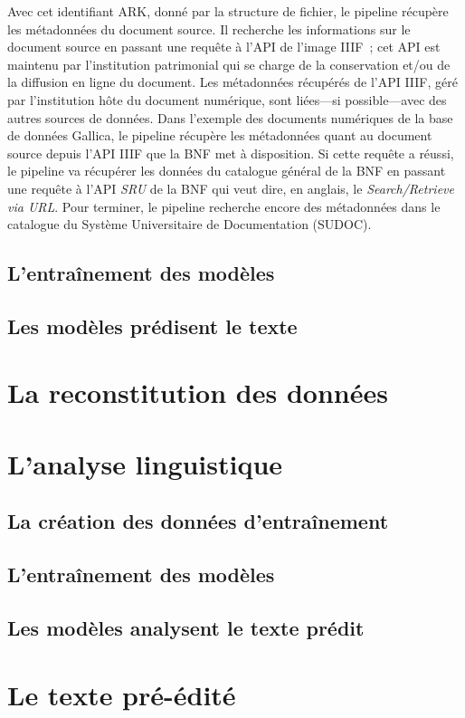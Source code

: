 \documentclass[class=article, crop=false]{standalone}
\begin{document}
Avec cet identifiant ARK, donné par la structure de fichier, le pipeline récupère les métadonnées du document source. Il recherche les informations sur le document source en passant une requête à l'API de l'image \acrshort{IIIF}~; cet API est maintenu par l'institution patrimonial qui se charge de la conservation et/ou de la diffusion en ligne du document. Les métadonnées récupérés de l'API IIIF, géré par l'institution hôte du document numérique, sont liées---si possible---avec des autres sources de données. Dans l'exemple des documents numériques de la base de données Gallica, le pipeline récupère les métadonnées quant au document source depuis l'API \acrshort{IIIF} que la \acrshort{BNF} met à disposition. Si cette requête a réussi, le pipeline va récupérer les données du catalogue général de la \acrshort{BNF} en passant une requête à l'API \textit{SRU} de la \acrshort{BNF} qui veut dire, en anglais, le \textit{Search/Retrieve via URL}. Pour terminer, le pipeline recherche encore des métadonnées dans le catalogue du Système Universitaire de Documentation (SUDOC).

\subsection{L'entraînement des modèles}

\subsection{Les modèles prédisent le texte}

\section{La reconstitution des données}

\section{L'analyse linguistique}

\subsection{La création des données d'entraînement}

\subsection{L'entraînement des modèles}

\subsection{Les modèles analysent le texte prédit}

\section{Le texte pré-édité}
\end{document}
